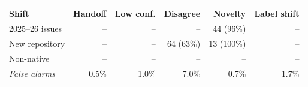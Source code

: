 \begin{tabular}{lrrrrr}
\toprule
Shift & Handoff & Low conf. & Disagree & Novelty & Label shift \\
\midrule
2025--26 issues & -- & -- & -- & 44 (96\%) & -- \\
New repository & -- & -- & 64 (63\%) & 13 (100\%) & -- \\
Non-native & -- & -- & -- & -- & -- \\
\midrule
\emph{False alarms} & 0.5\% & 1.0\% & 7.0\% & 0.7\% & 1.7\% \\
\bottomrule
\end{tabular}
